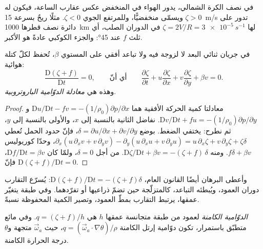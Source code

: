 في نصف الكرة الشمالي، يدور الهواء في المنخفض عكس عقارب الساعة،
فيكون له $\zeta > 0$ ويسمّى منخفضيًّا، وللمرتفع الجوي $\zeta < 0$. مثلًا
ريحٌ بسرعة \qty{15}{m/s} تدور على دائرة نصف قطرها \qty{1000}{km} لها $\zeta =
2V/R = \qty{3e-5}{s^{-1}}$ في الدوران الصلب، أي ثلث $f$ عند \ang{45}:
والجزء الكوكبي عادةً هو الأكبر.

\begin{theorem}\label{thm:b3:atmospheric-dynamics:bve}
في جريان ثنائي البعد لا لزوجة فيه ولا تباعد أفقي على
المستوي $\beta$، تُحفظ  لكلّ كتلة هوائية:
\[
\frac{\mathrm D(\zeta + f)}{\mathrm Dt} = 0 ,
\qquad\text{أي أنّ}\qquad
\frac{\partial\zeta}{\partial t} + u\frac{\partial\zeta}{\partial x} + v\frac{\partial\zeta}{\partial y} + \beta v = 0 .
\]
وهذه هي \emph{معادلة الدوّامية الباروتروبية}.
\end{theorem}

\begin{proof}
معادلتا كمية الحركة الأفقية هما $\mathrm Du/\mathrm Dt - fv =
-(1/\rho_0)\partial p/\partial x$ و$\mathrm Dv/\mathrm Dt + fu =
-(1/\rho_0)\partial p/\partial y$. نفاضل الثانية بالنسبة إلى
$x$، والأولى بالنسبة إلى $y$، ثم نطرح: يختفي الضغط.
بوضع $\delta = \partial u/\partial x + \partial v/\partial y$، فإنّ
حدود الحمل تُعطي $\partial_x(u\,\partial_xv + v\,\partial_yv) -
\partial_y(u\,\partial_xu + v\,\partial_yu) = u\,\partial_x\zeta +
v\,\partial_y\zeta + \zeta\delta$، وحدّا كوريوليس $f\delta + \beta
v$. ومنه $\mathrm D\zeta/\mathrm Dt + \beta v = -(\zeta + f)\,\delta$. من أجل
$\delta = 0$، ولمّا كان $\mathrm Df/\mathrm Dt = \beta v$، فإنّ $\mathrm D(\zeta +
f)/\mathrm Dt = 0$.
\end{proof}

وأعطى البرهان أيضًا القانون العام، $\mathrm D(\zeta + f)/\mathrm Dt =
-(\zeta + f)\delta$: يُسرّع التقارب دوران العمود،
ويُبطئه التباعد، كالمتزلّجة حين تضمّ ذراعيها أو تفرّدهما. وفي طبقة يتغيّر
عمقها، يرتبط التقارب بمطّ العمود، وتصير
الكمية المحفوظة نسبةً.

\begin{definition}\label{def:b3:atmospheric-dynamics:pv}
\emph{الدوّامية الكامنة} لعمود من
طبقة متجانسة عمقها $h$ هي $q = (\zeta + f)/h$. وفي مائع متطبّق
باستمرار، تكون دوّامية إرتل الكامنة $q = (\vec\omega_a\cdot
\nabla\theta)/\rho$، حيث $\vec\omega_a$ متجهة 
و$\theta$ درجة الحرارة الكامنة.
\end{definition}

